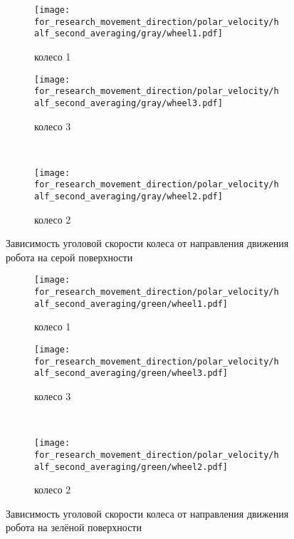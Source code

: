 \begin{figure}[H]
    \centering
    \begin{subfigure}{0.49\textwidth}
        \centering
        \texttt{[image: for\_research\_movement\_direction/polar\_velocity/half\_second\_averaging/gray/wheel1.pdf]}
        \caption{колесо 1}
    \end{subfigure}
    \hspace{0.005\textwidth}
    \begin{subfigure}{0.49\textwidth}
        \centering
        \texttt{[image: for\_research\_movement\_direction/polar\_velocity/half\_second\_averaging/gray/wheel3.pdf]}
        \caption{колесо 3}
    \end{subfigure} \\
    \vspace{4pt}
    \centering
    \begin{subfigure}{0.49\textwidth}
        \centering
        \texttt{[image: for\_research\_movement\_direction/polar\_velocity/half\_second\_averaging/gray/wheel2.pdf]}
        \caption{колесо 2}
    \end{subfigure}
    \caption{Зависимость уголовой скорости колеса от направления движения робота на серой поверхности}
\end{figure}

\begin{figure}[H]
    \centering
    \begin{subfigure}{0.49\textwidth}
        \centering
        \texttt{[image: for\_research\_movement\_direction/polar\_velocity/half\_second\_averaging/green/wheel1.pdf]}
        \caption{колесо 1}
    \end{subfigure}
    \hspace{0.005\textwidth}
    \begin{subfigure}{0.49\textwidth}
        \centering
        \texttt{[image: for\_research\_movement\_direction/polar\_velocity/half\_second\_averaging/green/wheel3.pdf]}
        \caption{колесо 3}
    \end{subfigure} \\
    \vspace{4pt}
    \centering
    \begin{subfigure}{0.49\textwidth}
        \centering
        \texttt{[image: for\_research\_movement\_direction/polar\_velocity/half\_second\_averaging/green/wheel2.pdf]}
        \caption{колесо 2}
    \end{subfigure}
    \caption{Зависимость уголовой скорости колеса от направления движения робота на зелёной поверхности}
\end{figure}


